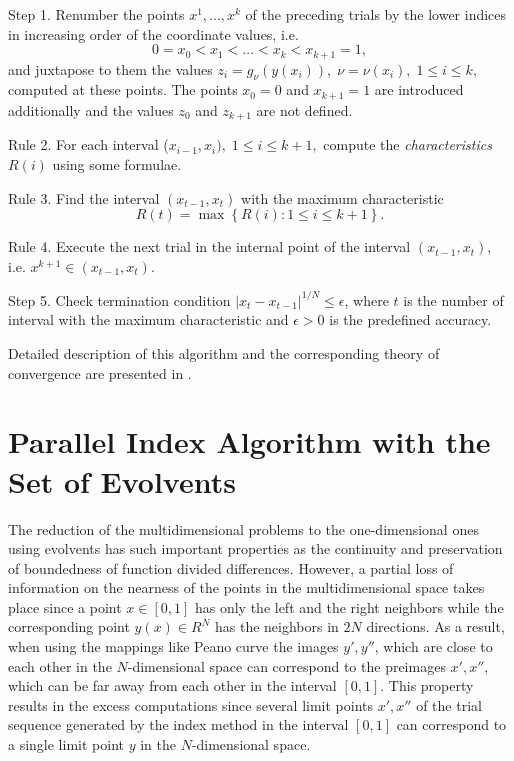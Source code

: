 \documentclass[smallextended]{svjour3}       %
\begin{document}
Step 1. Renumber the points $x^1,...,x^k$ of the preceding trials by the lower indices in increasing order of the coordinate values, i.e.
\[
0=x_0<x_1<\dots <x_k<x_{k+1}=1,
\]
and juxtapose to them the values $z_i=g_\nu(y(x_i)), \; \nu=\nu(x_i), \; 1 \leq i \leq k,$ computed at these points. The points $x_0=0$ and $x_{k+1}=1$ are introduced additionally and the values $z_0$ and $z_{k+1}$ are not defined.

Rule 2. For each interval ($x_{i-1},x_i), \; 1 \leq i \leq k+1,$ compute the \textit{characteristics} $R(i)$ using some formulae.

Rule 3. Find the interval $(x_{t-1},x_t)$ with the maximum characteristic
\begin{equation}\label{MaxR}
R(t)=\max{\left\{R(i): 1 \leq i \leq k+1\right\}}.
\end{equation}

Rule 4. Execute the next trial in the internal point of the interval $(x_{t-1},x_t)$, i.e. $x^{k+1} \in (x_{t-1},x_t)$.

Step 5. Check termination condition $\left|x_t-x_{t-1}\right|^{1/N}\leq \epsilon$, where $t$ is the number of interval with the maximum characteristic and $\epsilon > 0$ is the predefined accuracy.

Detailed description of this algorithm and the corresponding theory of convergence are presented in \cite{Strongin2000,Sergeyev2001,Barkalov2002}.


\section{Parallel Index Algorithm with the Set of Evolvents}
\label{sec:3}

The reduction of the multidimensional problems to the one-dimensional ones using evolvents has such important properties as the continuity and preservation of boundedness of function divided differences. However, a partial loss of information on the nearness of the points in the multidimensional space takes place since a point $x \in [0,1]$ has only the left and the right neighbors while the corresponding point $y(x) \in R^N$ has the neighbors in $2N$ directions. As a result, when using the mappings like Peano curve the images $y', y''$, which are close to each other in the $N$-dimensional space can correspond to the preimages $x', x''$, which can be far away from each other in the interval $[0,1]$. This property results in the excess computations since several limit points $x', x''$ of the trial sequence generated by the index method in the interval $[0,1]$ can correspond to a single limit point $y$ in the $N$-dimensional space.
\end{document}

